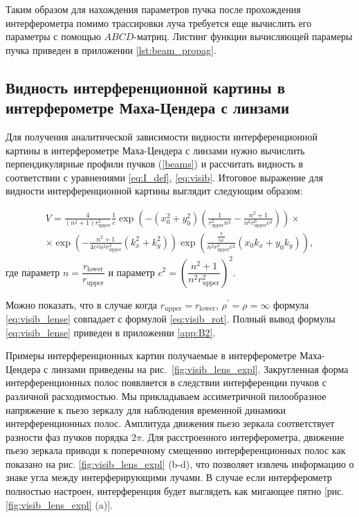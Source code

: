 Таким образом для нахождения параметров пучка после прохождения интерферометра помимо трассировки луча требуется еще вычислить его параметры с помощью $ABCD$-матриц. Листинг функции вычисляющей парамеры пучка приведен в приложении \ref{lst:beam_propag}.

\subsection{Видность интерференционной картины в интерферометре Маха-Цендера с линзами}\label{sec:ch2/sec1/subsec5}

Для получения аналитической зависимости видности интерференционной картины в интерферометре Маха-Цендера с линзами нужно вычислить перпендикулярные профили пучков  (\ref{beams}) и рассчитать видность в соответствии с уравнениями \ref{eq:I_def}, \ref{eq:visib}. Итоговое выражение для видности интерференционной картины выглядит следующим образом:

\begin{equation}
\begin{split}
    V =\frac{4}{\left(n^{2}+1\right) r_{\mathrm{upper}}^{2}} \frac{1}{c} \exp \left(-\left(x_{0}^{2}+y_{0}^{2}\right)\left(\frac{1}{r_{\mathrm{upper}}^{2} n^{2}}-\frac{n^{2}+1}{n^{6} r_{\mathrm{upper}}^{6} c^{2}}\right)\right) \times \\ \times \exp \left(-\frac{n^{2}+1}{4 c^{2} n^{2} r_{\mathrm{upper}}^{2}}\left(k_{x}^{2}+k_{y}^{2}\right)\right) \exp \left(\frac{\frac{\pi}{\lambda \rho^{\prime}}}{n^{2} r_{\mathrm{upper}}^{2} c^{2}}\left(x_{0} k_{x}+y_{0} k_{y}\right)\right),
\end{split}
\label{eq:visib_lense}
\end{equation}
где параметр $n=\dfrac{r_{\mathrm{lower}}}{r_{\mathrm{upper}}}$ и параметр $c^2 = (\dfrac{n^2 + 1}{n^2r^2_{\mathrm{upper}}})^2$.

Можно показать, что в случае когда $r_{\mathrm{upper}} = r_{\mathrm{lower}}$, $\rho^{\prime} = \rho = \infty$ формула \ref{eq:visib_lense} совпадает с формулой \ref{eq:visib_rot}. Полный вывод формулы \ref{eq:visib_lense} приведен в приложении \ref{app:B2}.

Примеры интерференционных картин получаемые в интерферометре Маха-Цендера с линзами приведены на рис.~\ref{fig:visib_lens_expl}. Закругленная форма интерференционных полос появляется в следствии интерференции пучков с различной расходимостью. Мы прикладываем ассиметричной пилообразное напряжение к пьезо зеркалу для наблюдения временной динамики интерференционных полос. Амплитуда движения пьезо зеркала соответствует разности фаз пучков порядка $2\pi$. Для расстроенного интерферометра, движение пьезо зеркала приводи к поперечному смещению интерференционных полос как показано на рис. \ref{fig:visib_lens_expl} (b-d), что позволяет извлечь информацию о знаке угла между интерферирующими лучами. В случае если интерферометр полностью настроен, интерференция будет выглядеть как мигающее пятно [рис. \ref{fig:visib_lens_expl} (a)].

